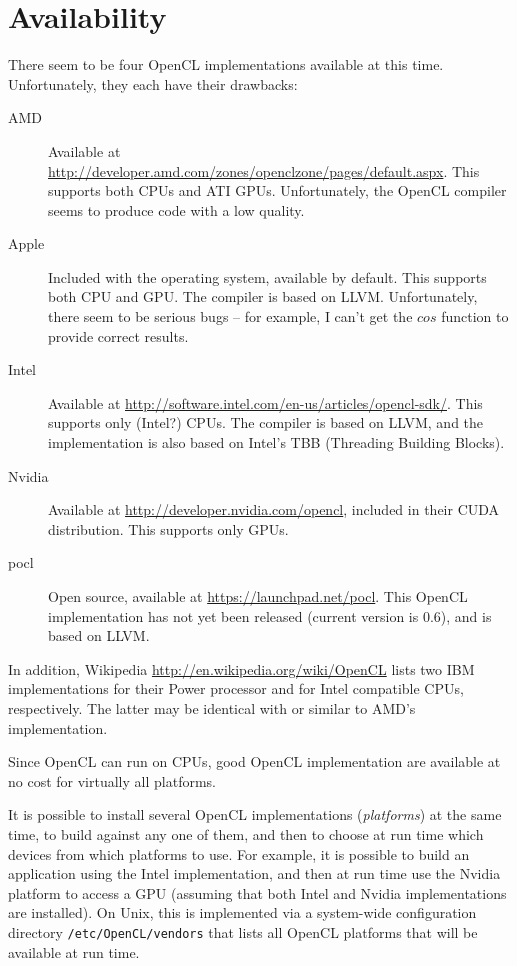 \section{Availability}

There seem to be four OpenCL implementations available at this time.
Unfortunately, they each have their drawbacks:

\begin{description}
\item[AMD] Available at
  \url{http://developer.amd.com/zones/openclzone/pages/default.aspx}.
  This supports both CPUs and ATI GPUs. Unfortunately, the OpenCL
  compiler seems to produce code with a low quality.
\item[Apple] Included with the operating system, available by
  default. This supports both CPU and GPU\@. The compiler is based on
  LLVM\@. Unfortunately, there seem to be serious bugs -- for example,
  I can't get the $cos$ function to provide correct results.
\item[Intel] Available at
  \url{http://software.intel.com/en-us/articles/opencl-sdk/}. This
  supports only (Intel?) CPUs. The compiler is based on LLVM, and the
  implementation is also based on Intel's TBB (Threading Building
  Blocks).
\item[Nvidia] Available at \url{http://developer.nvidia.com/opencl},
  included in their CUDA distribution. This supports only GPUs.
\item[pocl] Open source, available at
  \url{https://launchpad.net/pocl}. This OpenCL implementation has not
  yet been released (current version is 0.6), and is based on LLVM\@.
\end{description}

In addition, Wikipedia \url{http://en.wikipedia.org/wiki/OpenCL} lists
two IBM implementations for their Power processor and for Intel
compatible CPUs, respectively. The latter may be identical with or
similar to AMD's implementation.

Since OpenCL can run on CPUs, good OpenCL implementation are available
at no cost for virtually all platforms.

It is possible to install several OpenCL implementations
(\emph{platforms}) at the same time, to build against any one of them,
and then to choose at run time which devices from which platforms to
use. For example, it is possible to build an application using the
Intel implementation, and then at run time use the Nvidia platform to
access a GPU (assuming that both Intel and Nvidia implementations are
installed). On Unix, this is implemented via a system-wide
configuration directory \texttt{/etc/OpenCL/vendors} that lists all
OpenCL platforms that will be available at run time.



